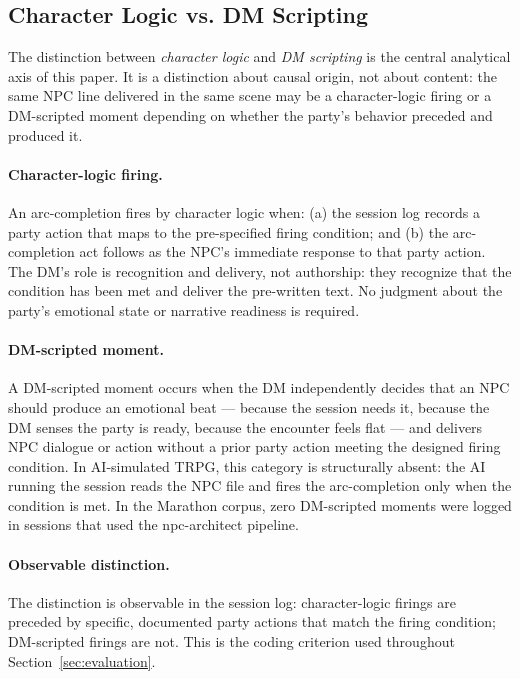 \subsection{Character Logic vs. DM Scripting}

The distinction between \textit{character logic} and \textit{DM scripting}
is the central analytical axis of this paper. It is a distinction about
causal origin, not about content: the same NPC line delivered in the same
scene may be a character-logic firing or a DM-scripted moment depending on
whether the party's behavior preceded and produced it.

\paragraph{Character-logic firing.}
An arc-completion fires by character logic when: (a) the session log records
a party action that maps to the pre-specified firing condition; and (b) the
arc-completion act follows as the NPC's immediate response to that party
action. The DM's role is recognition and delivery, not authorship: they
recognize that the condition has been met and deliver the pre-written text.
No judgment about the party's emotional state or narrative readiness is
required.

\paragraph{DM-scripted moment.}
A DM-scripted moment occurs when the DM independently decides that an NPC
should produce an emotional beat --- because the session needs it, because
the DM senses the party is ready, because the encounter feels flat --- and
delivers NPC dialogue or action without a prior party action meeting the
designed firing condition. In AI-simulated TRPG, this category is structurally
absent: the AI running the session reads the NPC file and fires the arc-completion
only when the condition is met. In the Marathon corpus, zero DM-scripted moments
were logged in sessions that used the npc-architect pipeline.

\paragraph{Observable distinction.}
The distinction is observable in the session log: character-logic firings are
preceded by specific, documented party actions that match the firing condition;
DM-scripted firings are not. This is the coding criterion used throughout
Section~\ref{sec:evaluation}.

